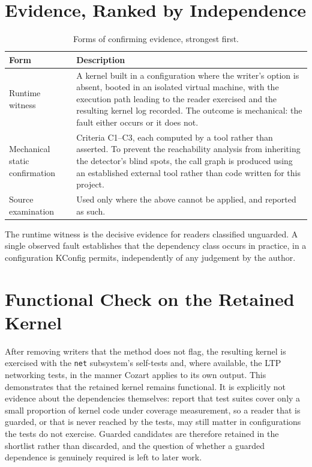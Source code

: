 \documentclass[12pt, a4paper, oneside]{book}
\begin{document}
\section{Evidence, Ranked by Independence}

\begin{table}[H]
\centering
\caption{Forms of confirming evidence, strongest first.}
\renewcommand{\arraystretch}{1.5}
\begin{tabularx}{\textwidth}{L{3.4cm} L{9.2cm}}
\toprule
\textbf{Form} & \textbf{Description} \\
\midrule
Runtime witness &
  A kernel built in a configuration where the writer's option is absent, booted
  in an isolated virtual machine, with the execution path leading to the reader
  exercised and the resulting kernel log recorded. The outcome is mechanical:
  the fault either occurs or it does not. \\
\addlinespace
Mechanical static confirmation &
  Criteria C1--C3, each computed by a tool rather than asserted. To prevent the
  reachability analysis from inheriting the detector's blind spots, the call
  graph is produced using an established external tool rather than code written
  for this project. \\
\addlinespace
Source examination &
  Used only where the above cannot be applied, and reported as such. \\
\bottomrule
\end{tabularx}
\end{table}

The runtime witness is the decisive evidence for readers classified unguarded. A
single observed fault establishes that the dependency class occurs in practice,
in a configuration KConfig permits, independently of any judgement by the author.

\section{Functional Check on the Retained Kernel}

After removing writers that the method does not flag, the resulting kernel is
exercised with the \texttt{net} subsystem's self-tests and, where available, the
LTP networking tests, in the manner Cozart applies to its own output. This
demonstrates that the retained kernel remains functional. It is explicitly not
evidence about the dependencies themselves: \citet{kuo2020cozart} report that
test suites cover only a small proportion of kernel code under coverage
measurement, so a reader that is guarded, or that is never reached by the tests,
may still matter in configurations the tests do not exercise. Guarded candidates
are therefore retained in the shortlist rather than discarded, and the question of
whether a guarded dependence is genuinely required is left to later work.
\end{document}
